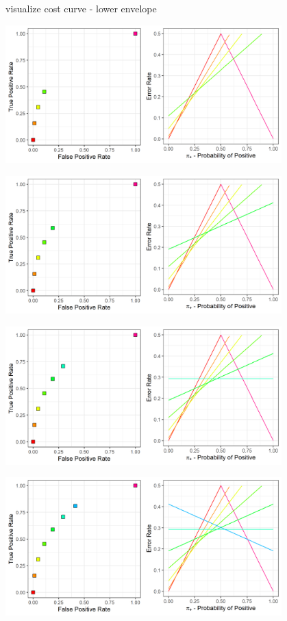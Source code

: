 \begin{frame}{visualize cost curve - lower envelope}
{\begin{center}
    \end{center}  
  }
   {
    \begin{center}
      \includegraphics[width=0.8\textwidth]{figure/lower_envelope_4.png}
    \end{center}  
  }
   {
    \begin{center}
      \includegraphics[width=0.8\textwidth]{figure/lower_envelope_5.png}
    \end{center}  
  }
   {
    \begin{center}
      \includegraphics[width=0.8\textwidth]{figure/lower_envelope_6.png}
    \end{center}  
  }
   {
    \begin{center}
      \includegraphics[width=0.8\textwidth]{figure/lower_envelope_7.png}

\end{center}}
\end{frame}
